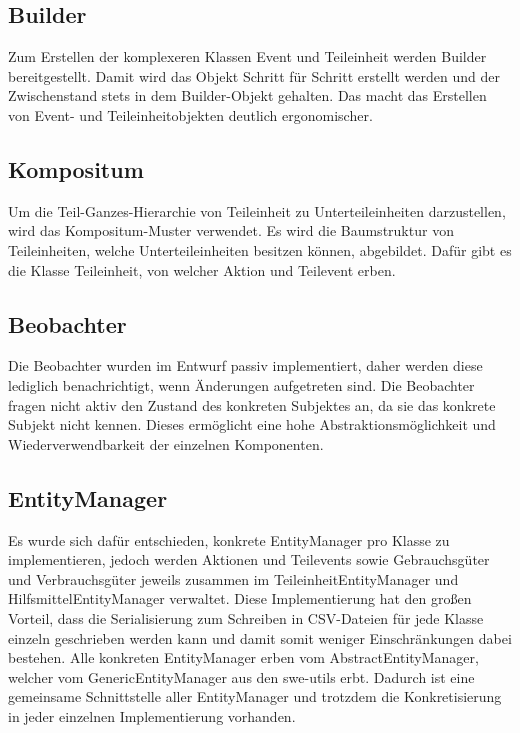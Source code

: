 \subsection{Builder}
Zum Erstellen der komplexeren Klassen Event und Teileinheit werden Builder bereitgestellt. Damit wird das Objekt Schritt für Schritt erstellt werden und der Zwischenstand stets in dem Builder-Objekt gehalten. Das macht das Erstellen von Event- und Teileinheitobjekten deutlich ergonomischer.
\subsection{Kompositum}
Um die Teil-Ganzes-Hierarchie von Teileinheit zu Unterteileinheiten darzustellen, wird das Kompositum-Muster verwendet. Es wird die Baumstruktur von Teileinheiten, welche Unterteileinheiten besitzen können, abgebildet. Dafür gibt es die Klasse Teileinheit, von welcher Aktion und Teilevent erben. 
\subsection{Beobachter}
Die Beobachter wurden im Entwurf passiv implementiert, daher werden diese lediglich benachrichtigt, wenn Änderungen aufgetreten sind. Die Beobachter fragen nicht aktiv den Zustand des konkreten Subjektes an, da sie das konkrete Subjekt nicht kennen. Dieses ermöglicht eine hohe Abstraktionsmöglichkeit und Wiederverwendbarkeit der einzelnen Komponenten.
\subsection{EntityManager}
Es wurde sich dafür entschieden, konkrete EntityManager pro Klasse zu implementieren, jedoch werden Aktionen und Teilevents sowie Gebrauchsgüter und Verbrauchsgüter jeweils zusammen im TeileinheitEntityManager und HilfsmittelEntityManager verwaltet. Diese Implementierung hat den großen Vorteil, dass die Serialisierung zum Schreiben in CSV-Dateien für jede Klasse einzeln geschrieben werden kann und damit somit weniger Einschränkungen dabei bestehen. Alle konkreten EntityManager erben vom AbstractEntityManager, welcher vom GenericEntityManager aus den swe-utils erbt. Dadurch ist eine gemeinsame Schnittstelle aller EntityManager und trotzdem die Konkretisierung in jeder einzelnen Implementierung vorhanden.
